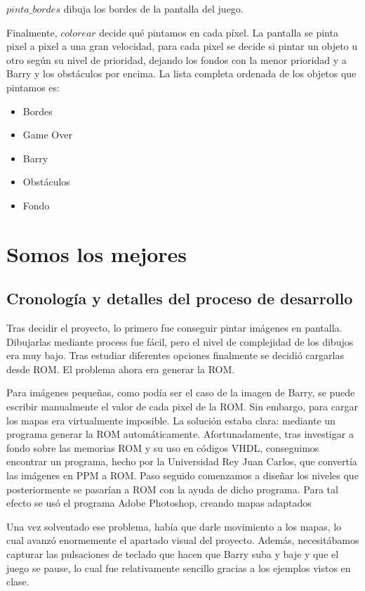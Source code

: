 \documentclass[11pt, a4paper, spanish, openright, twoside]{book}
\begin{document}
$pinta\_bordes$ dibuja los bordes de la pantalla del juego.

Finalmente, $colorear$ decide qué pintamos en cada píxel. La pantalla se pinta pixel a pixel a una gran velocidad, para cada pixel se decide si pintar un objeto u otro según su nivel de prioridad, dejando los fondos con la menor prioridad y a Barry y los obstáculos por encima. La lista completa ordenada de los objetos que pintamos es:
\begin{itemize}
	\item Bordes
	\item Game Over
	\item Barry
	\item Obstáculos
	\item Fondo
\end{itemize}

\section{Somos los mejores }
\subsection{Cronología y detalles del proceso de desarrollo}
Tras decidir el proyecto, lo primero fue conseguir pintar imágenes en pantalla. Dibujarlas mediante process fue fácil, pero el nivel de complejidad de los dibujos era muy bajo. Tras estudiar diferentes opciones finalmente se decidió cargarlas desde ROM.
El problema ahora era generar la ROM.

Para imágenes pequeñas, como podía ser el caso de la imagen de Barry, se puede escribir manualmente el valor de cada pixel de la ROM. Sin embargo, para cargar los mapas era virtualmente imposible. La solución estaba clara: mediante un programa generar la ROM automáticamente. Afortunadamente, tras investigar a fondo sobre las memorias ROM y su uso en códigos VHDL, conseguimos encontrar un programa, hecho por la Universidad Rey Juan Carlos, que convertía las imágenes en PPM a ROM. Paso seguido comenzamos a diseñar los niveles que posteriormente se pasarían a ROM con la ayuda de dicho programa. Para tal efecto se usó el programa Adobe Photoshop, creando mapas adaptados 


Una vez solventado ese problema, había que darle movimiento a los mapas, lo cual avanzó enormemente el apartado visual del proyecto.
Además, necesitábamos capturar las pulsaciones de teclado que hacen que Barry suba y baje y que el juego se pause, lo cual fue relativamente sencillo gracias a los ejemplos vistos en clase.
\end{document}
